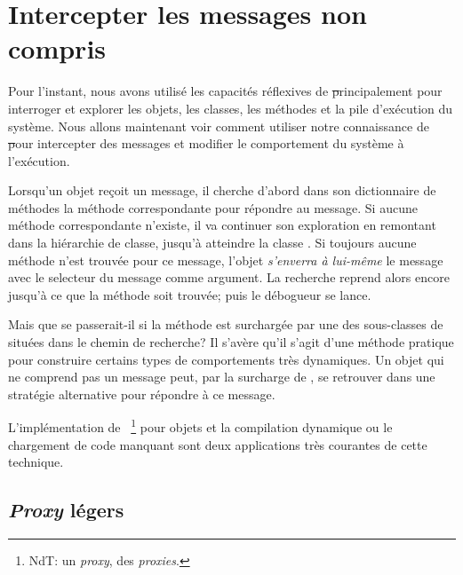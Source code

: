 \documentclass[a4paper,10pt,twoside]{book}
\begin{document}
\section{Intercepter les messages non compris}

Pour l'instant, nous avons utilisé les capacités réflexives de \st principalement pour interroger et explorer les objets, les classes, les méthodes et la pile d'exécution du système. Nous allons maintenant voir comment utiliser notre connaissance de \st pour intercepter des messages et modifier le comportement du système à l'exécution.

Lorsqu'un objet reçoit un message, il cherche d'abord dans son dictionnaire de méthodes la méthode correspondante pour répondre au message.
Si aucune méthode correspondante n'existe, il va continuer son exploration en remontant dans la hiérarchie de classe, jusqu'à atteindre la classe .
Si toujours aucune méthode n'est trouvée pour ce message, l'objet \emph{s'enverra à lui-même} %
le message  avec le selecteur du message comme argument.
La recherche reprend alors encore jusqu'à ce que la méthode
 soit trouvée; puis le débogueur se lance.

Mais que se passerait-il si la méthode  est surchargée 
par une des sous-classes de  situées dans le chemin de recherche? %
Il s'avère qu'il s'agit d'une méthode pratique pour construire certains types de comportements très dynamiques. Un objet qui ne comprend pas un message peut, par la surcharge de , se retrouver dans une stratégie alternative pour répondre à ce message.

L'implémentation de ~\footnote{NdT: un \emph{proxy}, des \emph{proxies}.} pour objets et la compilation dynamique ou le chargement de code manquant sont deux applications très courantes de cette technique.

\subsection{\emph{Proxy} légers}
\end{document}

